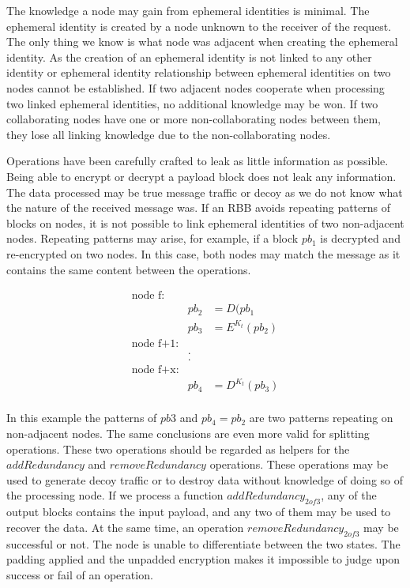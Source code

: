 The knowledge a node may gain from ephemeral identities is minimal. The ephemeral identity is created by a node unknown to the receiver of the request. The only thing we know is what node was adjacent when creating the ephemeral identity. As the creation of an ephemeral identity is not linked to any other identity or ephemeral identity relationship between ephemeral identities on two nodes cannot be established. If two adjacent nodes cooperate when processing two linked ephemeral identities, no additional knowledge may be won. If two collaborating nodes have one or more non-collaborating nodes between them, they lose all linking knowledge due to the non-collaborating nodes. 

Operations have been carefully crafted to leak as little information as possible. Being able to encrypt or decrypt a payload block does not leak any information. The data processed may be true message traffic or decoy as we do not know what the nature of the received message was. If an RBB avoids repeating patterns of blocks on nodes, it is not possible to link ephemeral identities of two non-adjacent nodes. Repeating patterns may arise, for example, if a block $pb_1$ is decrypted and re-encrypted on two nodes. In this case, both nodes may match the message as it contains the same content between the operations.

\begin{eqnarray*}
	\text{node f:}\\
	& pb_2 & = D(pb_1\\
	& pb_3 & = E^{K_t}(pb_2)\\
	\text{node f+1:}\\
	&.\\
	&.\\    
	\text{node f+x:}\\
	& pb_4 & = D^{K_t}(pb_3)\\
\end{eqnarray*}

In this example the patterns of $pb3$ and $pb_4=pb_2$ are two patterns repeating on non-adjacent nodes. The same conclusions are even more valid for splitting operations. These two operations should be regarded as helpers for the $addRedundancy$ and $removeRedundancy$ operations. These operations may be used to generate decoy traffic or to destroy data without knowledge of doing so of the processing node. If we process a function $addRedundancy_{2 of 3}$, any of the output blocks contains the input payload, and any two of them may be used to recover the data. At the same time, an operation $removeRedundancy_{2 of 3}$ may be successful or not. The node is unable to differentiate between the two states. The padding applied and the unpadded encryption makes it impossible to judge upon success or fail of an operation.

